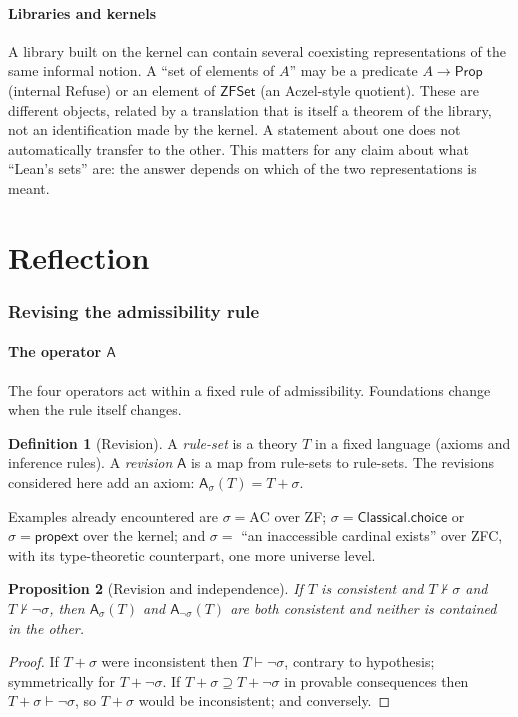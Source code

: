 \documentclass[11pt]{article}
\newcommand{\Rev}{\mathsf{A}}
\newcommand{\Prop}{\mathsf{Prop}}
\theoremstyle{definition}
\newtheorem{definition}{Definition}[section]
\theoremstyle{plain}
\newtheorem{proposition}[definition]{Proposition}
\theoremstyle{remark}
\begin{document}
\subsection{Libraries and kernels}

A library built on the kernel can contain several coexisting representations of the same informal notion. A ``set of elements of $A$'' may be a predicate $A\to\Prop$ (internal Refuse) or an element of $\mathsf{ZFSet}$ (an Aczel-style quotient). These are different objects, related by a translation that is itself a theorem of the library, not an identification made by the kernel. A statement about one does not automatically transfer to the other. This matters for any claim about what ``Lean's sets'' are: the answer depends on which of the two representations is meant.

\part{Reflection}

\section{Revising the admissibility rule}\label{sec:A}

\subsection{The operator $\Rev$}

The four operators act within a fixed rule of admissibility. Foundations change when the rule itself changes.

\begin{definition}[Revision]\label{def:A}
A \emph{rule-set} is a theory $T$ in a fixed language (axioms and inference rules). A \emph{revision} $\Rev$ is a map from rule-sets to rule-sets. The revisions considered here add an axiom: $\Rev_\sigma(T)=T+\sigma$.
\end{definition}

Examples already encountered are $\sigma=\mathrm{AC}$ over ZF; $\sigma=\mathsf{Classical.choice}$ or $\sigma=\mathsf{propext}$ over the kernel; and $\sigma=$ ``an inaccessible cardinal exists'' over ZFC, with its type-theoretic counterpart, one more universe level.

\begin{proposition}[Revision and independence]\label{prop:revision}
If $T$ is consistent and $T\nvdash\sigma$ and $T\nvdash\neg\sigma$, then $\Rev_\sigma(T)$ and $\Rev_{\neg\sigma}(T)$ are both consistent and neither is contained in the other.
\end{proposition}
\begin{proof}
If $T+\sigma$ were inconsistent then $T\vdash\neg\sigma$, contrary to hypothesis; symmetrically for $T+\neg\sigma$. If $T+\sigma\supseteq T+\neg\sigma$ in provable consequences then $T+\sigma\vdash\neg\sigma$, so $T+\sigma$ would be inconsistent; and conversely.
\end{proof}
\end{document}

